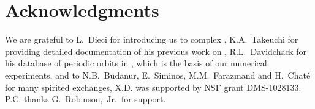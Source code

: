 \documentclass[final,leqno,onefignum,onetabnum]{siamltexmm}
\begin{document}
\section*{Acknowledgments}

We are grateful to L.~Dieci for introducing us to complex
\psd, K.A.~Takeuchi for providing detailed documentation of his previous work
on \cLvs, R.L.~Davidchack for his database of periodic
orbits in \KSe, which is the basis of our numerical experiments,
and to
N.B.~Budanur,  E.~Siminos,  M.M.~Farazmand and H.~Chat\'e
for many spirited exchanges,
X.D. was supported by NSF grant DMS-1028133.
P.C. thanks
G.~Robinson,~Jr.\ for support.




\ifboyscout
%
\fi
\end{document}
